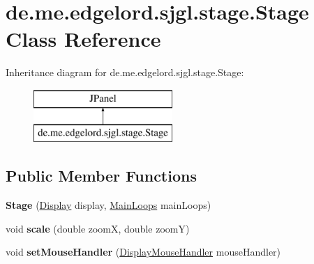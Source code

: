 \hypertarget{classde_1_1me_1_1edgelord_1_1sjgl_1_1stage_1_1_stage}{}\section{de.\+me.\+edgelord.\+sjgl.\+stage.\+Stage Class Reference}
\label{classde_1_1me_1_1edgelord_1_1sjgl_1_1stage_1_1_stage}
Inheritance diagram for de.\+me.\+edgelord.\+sjgl.\+stage.\+Stage\+:\begin{figure}[H]
\begin{center}
\leavevmode
\includegraphics[height=2.000000cm]{classde_1_1me_1_1edgelord_1_1sjgl_1_1stage_1_1_stage}
\end{center}
\end{figure}
\subsection*{Public Member Functions}
\begin{DoxyCompactItemize}
\item 
\mbox{\label{classde_1_1me_1_1edgelord_1_1sjgl_1_1stage_1_1_stage_a07c65f09fff666e05392f54f28c63b60}} 
{\bfseries Stage} (\mbox{\hyperlink{classde_1_1me_1_1edgelord_1_1sjgl_1_1display_1_1_display}{Display}} display, \mbox{\hyperlink{classde_1_1me_1_1edgelord_1_1sjgl_1_1core_1_1_main_loops}{Main\+Loops}} main\+Loops)
\item 
\mbox{\label{classde_1_1me_1_1edgelord_1_1sjgl_1_1stage_1_1_stage_a383c81825eb6fc2184b0b713575c5ded}} 
void {\bfseries scale} (double zoomX, double zoomY)
\item 
\mbox{\label{classde_1_1me_1_1edgelord_1_1sjgl_1_1stage_1_1_stage_a79759c764d83f4d7074c347c23758392}} 
void {\bfseries set\+Mouse\+Handler} (\mbox{\hyperlink{interfacede_1_1me_1_1edgelord_1_1sjgl_1_1input_1_1_display_mouse_handler}{Display\+Mouse\+Handler}} mouse\+Handler)
\end{DoxyCompactItemize}
